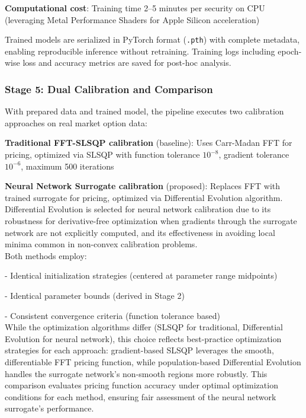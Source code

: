 \documentclass[12pt,a4paper]{article}
\begin{document}
\textbf{Computational cost}: Training time 2--5 minutes per security on CPU (leveraging Metal Performance Shaders for Apple Silicon acceleration)

Trained models are serialized in PyTorch format ({\tt .pth}) with complete metadata, enabling reproducible inference without retraining. Training logs including epoch-wise loss and accuracy metrics are saved for post-hoc analysis.

\subsubsection{Stage 5: Dual Calibration and Comparison}

With prepared data and trained model, the pipeline executes two calibration approaches on real market option data:

\textbf{Traditional FFT-SLSQP calibration} (baseline): Uses Carr-Madan FFT for pricing, optimized via SLSQP with function tolerance $10^{-8}$, gradient tolerance $10^{-6}$, maximum 500 iterations

\textbf{Neural Network Surrogate calibration} (proposed): Replaces FFT with trained surrogate for pricing, optimized via Differential Evolution algorithm. Differential Evolution is selected for neural network calibration due to its robustness for derivative-free optimization when gradients through the surrogate network are not explicitly computed, and its effectiveness in avoiding local minima common in non-convex calibration problems.\\[0.01cm]

Both methods employ:

- Identical initialization strategies (centered at parameter range midpoints)

- Identical parameter bounds (derived in Stage 2)

- Consistent convergence criteria (function tolerance based)\\[0.01cm]

While the optimization algorithms differ (SLSQP for traditional, Differential Evolution for neural network), this choice reflects best-practice optimization strategies for each approach: gradient-based SLSQP leverages the smooth, differentiable FFT pricing function, while population-based Differential Evolution handles the surrogate network's non-smooth regions more robustly. This comparison evaluates pricing function accuracy under optimal optimization conditions for each method, ensuring fair assessment of the neural network surrogate's performance.
\end{document}
